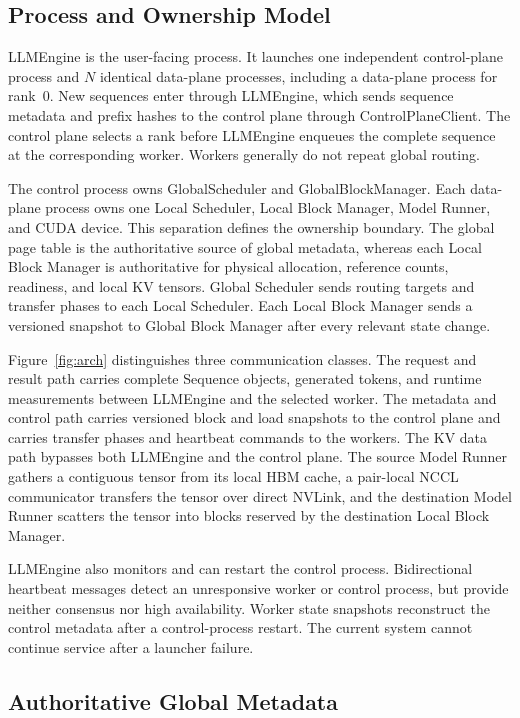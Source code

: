 \documentclass{article}
\begin{document}
\subsection{Process and Ownership Model}

LLMEngine is the user-facing process. It launches one independent control-plane process and $N$ identical data-plane processes, including a data-plane process for rank~0. New sequences enter through LLMEngine, which sends sequence metadata and prefix hashes to the control plane through ControlPlaneClient. The control plane selects a rank before LLMEngine enqueues the complete sequence at the corresponding worker. Workers generally do not repeat global routing.

The control process owns GlobalScheduler and GlobalBlockManager. Each data-plane process owns one Local Scheduler, Local Block Manager, Model Runner, and CUDA device. This separation defines the ownership boundary. The global page table is the authoritative source of global metadata, whereas each Local Block Manager is authoritative for physical allocation, reference counts, readiness, and local KV tensors. Global Scheduler sends routing targets and transfer phases to each Local Scheduler. Each Local Block Manager sends a versioned snapshot to Global Block Manager after every relevant state change.

Figure~\ref{fig:arch} distinguishes three communication classes. The request and result path carries complete Sequence objects, generated tokens, and runtime measurements between LLMEngine and the selected worker. The metadata and control path carries versioned block and load snapshots to the control plane and carries transfer phases and heartbeat commands to the workers. The KV data path bypasses both LLMEngine and the control plane. The source Model Runner gathers a contiguous tensor from its local HBM cache, a pair-local NCCL communicator transfers the tensor over direct NVLink, and the destination Model Runner scatters the tensor into blocks reserved by the destination Local Block Manager.

LLMEngine also monitors and can restart the control process. Bidirectional heartbeat messages detect an unresponsive worker or control process, but provide neither consensus nor high availability. Worker state snapshots reconstruct the control metadata after a control-process restart. The current system cannot continue service after a launcher failure.

\subsection{Authoritative Global Metadata}
\end{document}
